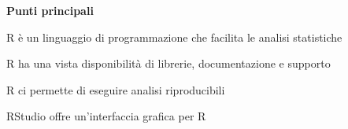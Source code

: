 \vspace{0.5cm}

\begin{tcolorbox}[width=1\linewidth, halign=left, colframe=blue!60, colback=white, boxsep=1mm, arc=3mm]

\textbf{Punti principali}

\begin{myitemize}
	\item R \`e un linguaggio di programmazione che facilita le analisi statistiche
	\item R ha una vista disponibilit\`a di librerie, documentazione e supporto
    \item R ci permette di eseguire analisi riproducibili
    \item RStudio offre un'interfaccia grafica per R
\end{myitemize}

\end{tcolorbox}
